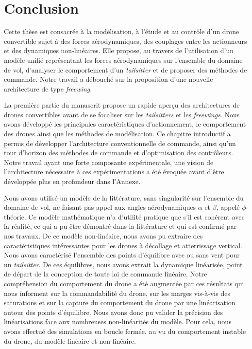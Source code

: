 \chapter*{Conclusion}

\renewcommand{\thefigure}{C.\arabic{figure}}
\setcounter{figure}{0} %

Cette thèse est consacrée à la modélisation, à l'étude et au contrôle d'un drone convertible sujet à des forces aérodynamiques, des couplages entre les actionneurs et des dynamiques non-linéaires. Elle propose, au travers de l'utilisation d'un modèle unifié représentant les forces aérodynamiques sur l'ensemble du domaine de vol, d'analyser le comportement d'un \textit{tailsitter} et de proposer des méthodes de commande. Notre travail a débouché sur la proposition d'une nouvelle architecture de type \textit{freewing}.

La première partie du manuscrit propose un rapide aperçu des architectures de drones convertibles avant de se focaliser sur les \textit{tailsitters} et les \textit{freewings}. Nous avons développé les principales caractéristiques d'actionnement, le comportement des drones ainsi que les méthodes de modélisation. Ce chapitre introductif a permis de développer l'architecture conventionnelle de commande, ainsi qu'un tour d'horizon des méthodes de commande et d'optimisation des contrôleurs. Notre travail ayant une forte composante expérimentale, une vision de l'architecture nécessaire à ces expérimentations a été évoquée avant d'être développée plus en profondeur dans l'Annexe.  

Nous avons utilisé un modèle de la littérature, sans singularité sur l'ensemble du domaine de vol, ne faisant pas appel aux angles aérodynamiques $\alpha$ et $\beta$, appelé $\phi$-théorie. Ce modèle mathématique n'a d'utilité pratique que s'il est cohérent avec la réalité, ce qui a pu être démontré dans la littérature et qui est confirmé par nos travaux. De ce modèle non-linéaire, nous avons pu extraire des caractéristiques intéressantes pour les drones à décollage et atterrissage vertical. 
Nous avons caractérisé l'ensemble des points d'équilibre avec ou sans vent pour un \textit{tailsitter}. De ces équilibres, nous avons extrait la dynamique linéarisée, point de départ de la conception de toute loi de commande linéaire. Notre compréhension du comportement du drone a été augmentée par ces résultats qui nous informent sur la commandabilité du drone, sur les marges vis-à-vis des saturations et sur la capture du comportement du drone par une linéarisation autour des points d'équilibre. Nous avons donc pu valider la précision des linéarisations face aux nombreuses non-linéarités du modèle. Pour cela, nous avons effectué des simulations en boucle fermée, au vu du comportement instable du drone, du modèle linéaire et non-linéaire.

